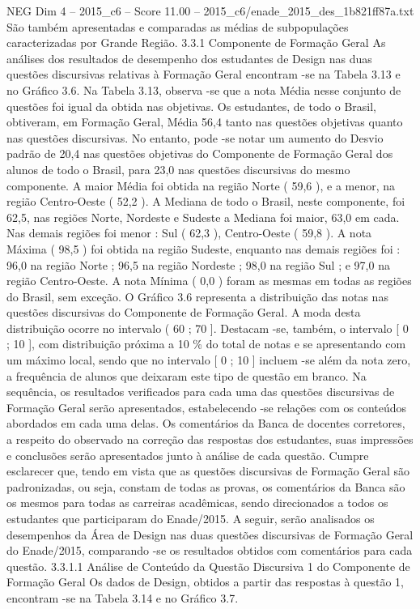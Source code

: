 \begin{textsample}{NEG Dim 4 – 2015\_c6 – Score 11.00 – 2015\_c6/enade\_2015\_des\_1b821ff87a.txt}
São também apresentadas e comparadas as médias de subpopulações caracterizadas por Grande Região. 3.3.1 Componente de Formação Geral As análises dos resultados de desempenho dos estudantes de Design nas duas questões discursivas relativas à Formação Geral encontram -se na Tabela 3.13 e no Gráfico 3.6.
Na Tabela 3.13, observa -se que a nota Média nesse conjunto de questões foi igual da obtida nas objetivas.
Os estudantes, de todo o Brasil, obtiveram, em Formação Geral, Média 56,4 tanto nas questões objetivas quanto nas questões discursivas.
No entanto, pode -se notar um aumento do Desvio padrão de 20,4 nas questões objetivas do Componente de Formação Geral dos alunos de todo o Brasil, para 23,0 nas questões discursivas do mesmo componente.
A maior Média foi obtida na região Norte ( 59,6 ), e a menor, na região Centro-Oeste ( 52,2 ).
A Mediana de todo o Brasil, neste componente, foi 62,5, nas regiões Norte, Nordeste e Sudeste a Mediana foi maior, 63,0 em cada.
Nas demais regiões foi menor : Sul ( 62,3 ), Centro-Oeste ( 59,8 ).
A nota Máxima ( 98,5 ) foi obtida na região Sudeste, enquanto nas demais regiões foi : 96,0 na região Norte ; 96,5 na região Nordeste ; 98,0 na região Sul ; e 97,0 na região Centro-Oeste.
A nota Mínima ( 0,0 ) foram as mesmas em todas as regiões do Brasil, sem exceção.
O Gráfico 3.6 representa a distribuição das notas nas questões discursivas do Componente de Formação Geral.
A moda desta distribuição ocorre no intervalo ( 60 ; 70 ].
Destacam -se, também, o intervalo [ 0 ; 10 ], com distribuição próxima a 10 \% do total de notas e se apresentando com um máximo local, sendo que no intervalo [ 0 ; 10 ] incluem -se além da nota zero, a frequência de alunos que deixaram este tipo de questão em branco.
Na sequência, os resultados verificados para cada uma das questões discursivas de Formação Geral serão apresentados, estabelecendo -se relações com os conteúdos abordados em cada uma delas.
Os comentários da Banca de docentes corretores, a respeito do observado na correção das respostas dos estudantes, suas impressões e conclusões serão apresentados junto à análise de cada questão.
Cumpre esclarecer que, tendo em vista que as questões discursivas de Formação Geral são padronizadas, ou seja, constam de todas as provas, os comentários da Banca são os mesmos para todas as carreiras acadêmicas, sendo direcionados a todos os estudantes que participaram do Enade/2015.
A seguir, serão analisados os desempenhos da Área de Design nas duas questões discursivas de Formação Geral do Enade/2015, comparando -se os resultados obtidos com comentários para cada questão. 3.3.1.1 Análise de Conteúdo da Questão Discursiva 1 do Componente de Formação Geral Os dados de Design, obtidos a partir das respostas à questão 1, encontram -se na Tabela 3.14 e no Gráfico 3.7.

\end{textsample}
